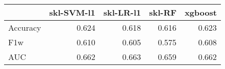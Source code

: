 \begin{tabular}{lrrrr}
\toprule
{} &  skl-SVM-l1 &  skl-LR-l1 &  skl-RF &  xgboost \\
\midrule
Accuracy &       0.624 &      0.618 &   0.616 &    0.623 \\
F1w      &       0.610 &      0.605 &   0.575 &    0.608 \\
AUC      &       0.662 &      0.663 &   0.659 &    0.662 \\
\bottomrule
\end{tabular}
